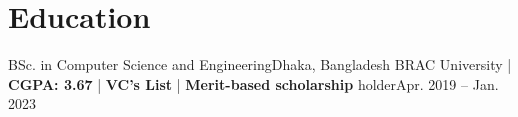 \section{Education}
\resumeSubHeadingListStart
\resumeSubheading
{BSc. in Computer Science and Engineering}{Dhaka, Bangladesh}
{BRAC University | \textbf{CGPA: 3.67} | \textbf{VC's List} | \textbf{Merit-based scholarship} holder}{Apr. 2019 -- Jan. 2023}
\resumeSubHeadingListEnd
